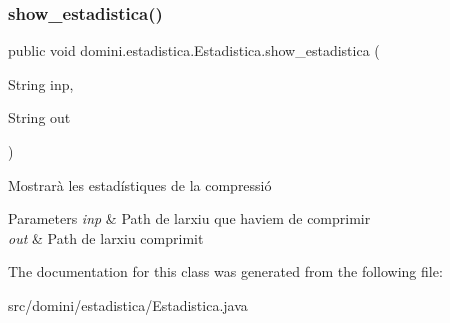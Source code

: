 \subsubsection{\texorpdfstring{show\+\_\+estadistica()}{show\_estadistica()}}
{\footnotesize\ttfamily public void domini.\+estadistica.\+Estadistica.\+show\+\_\+estadistica (\begin{DoxyParamCaption}\item[{String}]{inp,  }\item[{String}]{out }\end{DoxyParamCaption})\hspace{0.3cm}{\ttfamily [inline]}}



Mostrarà les estadístiques de la compressió 


\begin{DoxyParams}{Parameters}
{\em inp} & Path de l\textquotesingle{}arxiu que haviem de comprimir \\
\hline
{\em out} & Path de l\textquotesingle{}arxiu comprimit \\
\hline
\end{DoxyParams}


The documentation for this class was generated from the following file\+:\begin{DoxyCompactItemize}
\item 
src/domini/estadistica/Estadistica.\+java\end{DoxyCompactItemize}
